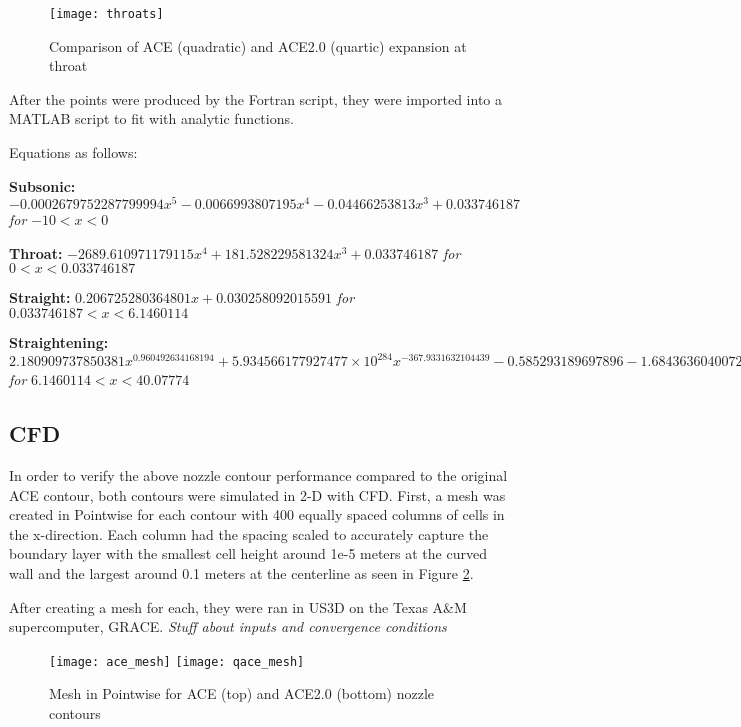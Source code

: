 \begin{figure}[ht]
    \centering
    \texttt{[image: throats]}
    \caption{Comparison of ACE (quadratic) and ACE2.0 (quartic) expansion at throat}
    \label{fig:throats}
\end{figure}

After the points were produced by the Fortran script, they were imported into a MATLAB script to fit with analytic functions. 

Equations as follows:

\textbf{Subsonic:} $-0.0002679752287799994x^5 - 0.0066993807195x^4 - 0.04466253813x^3 + 0.033746187$ \textit{for} $-10 < x < 0$

\textbf{Throat:} $-2689.610971179115x^4 + 181.528229581324x^3 + 0.033746187$ \textit{for} $0 < x < 0.033746187$

\textbf{Straight:} $0.206725280364801x + 0.030258092015591$ \textit{for} $0.033746187 < x < 6.1460114$

\textbf{Straightening:} $2.180909737850381x^{0.960492634168194} + 5.934566177927477 \times 10^{284} x^{-367.9331632104439} - 0.585293189697896 - 1.684363604007221x^{1.011336503949665} - 0.023814395465567 \ln(0.418646933043039x)$ \textit{for} $6.1460114 < x < 40.07774$

\subsection{CFD}

In order to verify the above nozzle contour performance compared to the original ACE contour, both contours were simulated in 2-D with CFD. First, a mesh was created in Pointwise for each contour with 400 equally spaced columns of cells in the x-direction. Each column had the spacing scaled to accurately capture the boundary layer with the smallest cell height around 1e-5 meters at the curved wall and the largest around 0.1 meters at the centerline as seen in Figure \ref{fig:mesh}.

After creating a mesh for each, they were ran in US3D on the Texas A\&M supercomputer, GRACE. \textit{Stuff about inputs and convergence conditions}

\begin{figure}[ht]
    \centering
    \texttt{[image: ace\_mesh]}
    \texttt{[image: qace\_mesh]}
    \caption{Mesh in Pointwise for ACE (top) and ACE2.0 (bottom) nozzle contours}
    \label{fig:mesh}
\end{figure}

